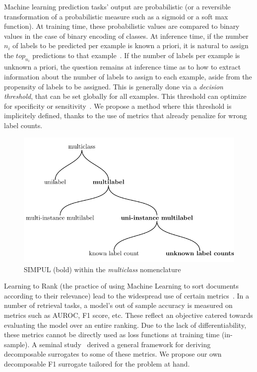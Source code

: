 Machine learning prediction tasks' output are probabilistic (or a reversible transformation of a probabilistic measure such as a sigmoid or a soft max function). At training time, these probabilistic values are compared to binary values in the case of binary encoding of classes. At inference time, if the number $n_i$ of labels to be predicted per example is known a priori, it is natural to assign the $top_{n_i}$ predictions to that example~\cite{lossTopKError, topKmulticlassSVM}. If the number of labels per example is unknown a priori, the question remains at inference time as to how to extract information about the number of labels to assign to each example, aside from the propensity of labels to be assigned. This is generally done via a \emph{decision threshold}, that can be set globally for all examples. This threshold can optimize for specificity or sensitivity~\cite{decisionThreshold}. We propose a method where this threshold is implicitely defined, thanks to the use of metrics that already penalize for wrong label counts.

\begin{figure}[t]
\centering
\includegraphics[width=.9\linewidth]{./tree/Tree.pdf}
\caption{\label{fig:tree}
SIMPUL (bold) within the \emph{multiclass} nomenclature
}
\end{figure}

Learning to Rank (the practice of using Machine Learning to sort documents according to their relevance) lead to the widespread use of certain metrics~\cite{LTR}. In a number of retrieval tasks, a model's out of sample accuracy is measured on metrics such as AUROC, F1 score, etc. These reflect an objective catered towards evaluating the model over an entire ranking. Due to the lack of differentiability, these metrics cannot be directly used as loss functions at training time (in-sample). A seminal study~\cite{optimizableLosses} derived a general framework for deriving decomposable surrogates to some of these metrics. We propose our own decomposable F1 surrogate tailored for the problem at hand.

